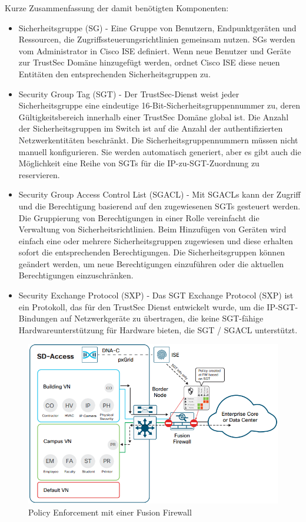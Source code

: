 Kurze Zusammenfassung der damit benötigten Komponenten:
\begin{itemize}
	\item Sicherheitsgruppe (SG) - Eine Gruppe von Benutzern, Endpunktgeräten und Ressourcen, die Zugriffssteuerungsrichtlinien gemeinsam nutzen. SGs werden vom Administrator in Cisco ISE definiert. Wenn neue Benutzer und Geräte zur TrustSec Domäne hinzugefügt werden, ordnet Cisco ISE diese neuen Entitäten den entsprechenden Sicherheitsgruppen zu.
	\item Security Group Tag (SGT) - Der TrustSec-Dienst weist jeder Sicherheitsgruppe eine eindeutige 16-Bit-Sicherheitsgruppennummer zu, deren Gültigkeitsbereich innerhalb einer TrustSec Domäne global ist. Die Anzahl der Sicherheitsgruppen im Switch ist auf die Anzahl der authentifizierten Netzwerkentitäten beschränkt. Die Sicherheitsgruppennummern müssen nicht manuell konfigurieren. Sie werden automatisch generiert, aber es gibt auch die Möglichkeit eine Reihe von SGTs für die IP-zu-SGT-Zuordnung zu reservieren.
	\item Security Group Access Control List (SGACL) - Mit SGACLs kann der Zugriff und die Berechtigung basierend auf den zugewiesenen SGTs gesteuert werden. Die Gruppierung von Berechtigungen in einer Rolle vereinfacht die Verwaltung von Sicherheitsrichtlinien. Beim Hinzufügen von Geräten wird einfach eine oder mehrere Sicherheitsgruppen zugewiesen und diese erhalten sofort die entsprechenden Berechtigungen. Die Sicherheitsgruppen können geändert werden, um neue Berechtigungen einzuführen oder die aktuellen Berechtigungen einzuschränken.
	\item Security Exchange Protocol (SXP) - Das SGT Exchange Protocol (SXP) ist ein Protokoll, das für den TrustSec Dienst entwickelt wurde, um die IP-SGT-Bindungen auf Netzwerkgeräte zu übertragen, die keine SGT-fähige Hardwareunterstützung für Hardware bieten, die SGT / SGACL unterstützt.
\end{itemize}

\begin{figure}[H]
	\centering
	\includegraphics[width=1\linewidth]{img/Absicherung/SGT-FusionFirewall}
	\caption{Policy Enforcement mit einer Fusion Firewall}
	\label{fig:Policy Enforcement mit einer Fusion Firewall}
\end{figure}

